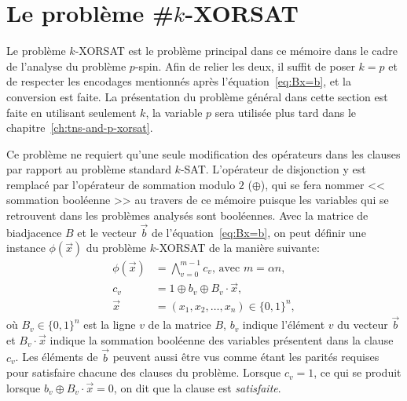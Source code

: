 \section{Le problème \#\texorpdfstring{$k$}{k}-XORSAT}\label{sec:k-xorsat}
Le problème $k$-XORSAT est le problème principal dans ce mémoire dans le cadre de l'analyse du problème $p$-spin.
Afin de relier les deux, il suffit de poser $k = p$ et de respecter les encodages mentionnés après l'équation~\ref{eq:Bx=b}, et la conversion est faite.
La présentation du problème général dans cette section est faite en utilisant seulement $k$, la variable $p$ sera utilisée plus tard dans le chapitre~\ref{ch:tns-and-p-xorsat}.

Ce problème ne requiert qu'une seule modification des opérateurs dans les clauses par rapport au problème standard $k$-SAT.
L'opérateur de disjonction y est remplacé par l'opérateur de sommation modulo $2$ ($\oplus$), qui se fera nommer << sommation booléenne >> au travers de ce mémoire puisque les variables qui se retrouvent dans les problèmes analysés sont booléennes.
Avec la matrice de biadjacence $B$ et le vecteur $\vec{b}$ de l'équation~\ref{eq:Bx=b}, on peut définir une instance $\phi(\vec{x})$ du problème $k$-XORSAT de la manière suivante:
\begin{equation}\label{eq:xorsat_def}
    \begin{split}
        \phi(\vec{x}) &= \bigwedge_{v = 0}^{m - 1} c_v \text{, avec }m = \alpha n,\\
        c_v &= 1 \oplus b_v \oplus B_v \cdot \vec{x},\\
        \vec{x} &= \left(x_1, x_2, \ldots, x_n \right) \in \{0, 1\}^n,
    \end{split}
\end{equation}
où $B_v \in \{0, 1\}^n$ est la ligne $v$ de la matrice $B$, $b_v$ indique l'élément $v$ du vecteur $\vec{b}$ et $B_v \cdot \vec{x}$ indique la sommation booléenne des variables présentent dans la clause $c_v$.
Les éléments de $\vec{b}$ peuvent aussi être vus comme étant les parités requises pour satisfaire chacune des clauses du problème.
Lorsque $c_v = 1$, ce qui se produit lorsque $b_v \oplus B_v \cdot \vec{x} = 0$, on dit que la clause est \emph{satisfaite}.

